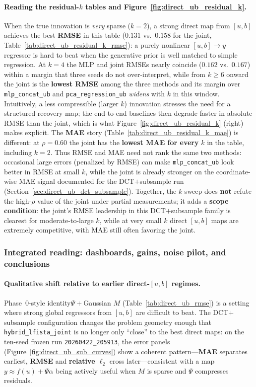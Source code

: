 \paragraph{Reading the residual-$k$ tables and Figure~\ref{fig:direct_ub_residual_k}.}
When the true innovation is \emph{very} sparse ($k=2$), a strong direct map from $[u,b]$ achieves the best \textbf{RMSE} in this table ($0.131$ vs.\ $0.158$ for the joint, Table~\ref{tab:direct_ub_residual_k_rmse}): a purely nonlinear $[u,b]\to y$ regressor is hard to beat when the generative prior is well matched to simple regression.
At $k=4$ the MLP and joint RMSEs nearly coincide ($0.162$ vs.\ $0.167$) within a margin that three seeds do not over-interpret, while from $k\ge 6$ onward the joint is the \textbf{lowest RMSE} among the three methods and its margin over \texttt{mlp\_concat\_ub} and \texttt{pca\_regression\_ub} \emph{widens} with $k$ in this window. Intuitively, a less compressible (larger $k$) innovation stresses the need for a structured recovery map; the end-to-end baselines then degrade faster in absolute RMSE than the joint, which is what Figure~\ref{fig:direct_ub_residual_k} (right) makes explicit.
The \textbf{MAE} story (Table~\ref{tab:direct_ub_residual_k_mae}) is different: at $\rho=0.60$ the joint has the \textbf{lowest MAE for every} $k$ in the table, including $k=2$. Thus RMSE and MAE need not rank the same two methods: occasional large errors (penalized by RMSE) can make \texttt{mlp\_concat\_ub} look better in RMSE at small $k$, while the joint is already stronger on the coordinate-wise MAE signal documented for the DCT$+$subsample run (Section~\ref{sec:direct_ub_dct_subsample}).
Together, the $k$ sweep does \textbf{not} refute the high-$\rho$ value of the joint under partial measurements; it adds a \textbf{scope condition}: the joint's RMSE leadership in this DCT$+$subsample family is clearest for moderate-to-large $k$, while at very small $k$ direct $[u,b]$ maps are extremely competitive, with MAE still often favoring the joint.

\subsubsection{Integrated reading: dashboards, gains, noise pilot, and conclusions}

\paragraph{Qualitative shift relative to earlier direct-$[u,b]$ regimes.}
Phase~0-style identity$\Psi+$Gaussian $M$ (Table~\ref{tab:direct_ub_rmse}) is a setting where strong global regressors from $[u,b]$ are difficult to beat. The DCT$+$subsample configuration changes the problem geometry enough that \texttt{hybrid\_lfista\_joint} is no longer only ``close'' to the best direct maps: on the ten-seed frozen run \texttt{20260422\_205913}, the error panels (Figure~\ref{fig:direct_ub_sub_curves}) show a coherent pattern---\textbf{MAE} separates earliest, \textbf{RMSE} and \textbf{relative $\ell_2$} cross later---consistent with a map $y\approx f(u)+\Psi\alpha$ being actively useful when $M$ is sparse and $\Psi$ compresses residuals.

